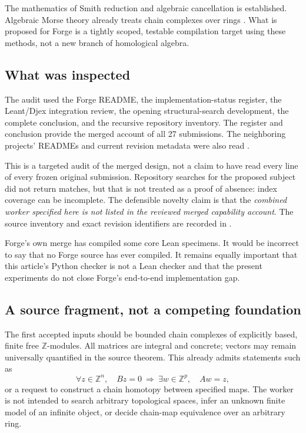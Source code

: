 \documentclass[11pt,letterpaper]{article}
\theoremstyle{definition}\newtheorem{definition}[theorem]{Definition}
\theoremstyle{remark}\newtheorem{remark}[theorem]{Remark}
\newcommand{\Z}{\mathbb Z}\newcommand{\Q}{\mathbb Q}
\newcommand{\code}[1]{\texttt{\detokenize{#1}}}
\begin{document}
The mathematics of Smith reduction and algebraic cancellation is established.
Algebraic Morse theory already treats chain complexes over rings
\cite{skoldberg}. What is proposed for Forge is a tightly scoped, testable
compilation target using these methods, not a new branch of homological algebra.

\subsection{What was inspected}
The audit used the Forge README, the implementation-status register, the
Leant/Djex integration review, the opening structural-search development,
the complete conclusion, and the recursive repository inventory. The register
and conclusion provide the merged account of all 27 submissions. The neighboring
projects' READMEs and current revision metadata were also read
\cite{forge-readme,forge-status,forge-neighbors,forge-structural,
forge-conclusion,leant,djex}.

This is a targeted audit of the merged design, not a claim to have read every
line of every frozen original submission. Repository searches for the proposed
subject did not return matches, but that is not treated as a proof of absence:
index coverage can be incomplete. The defensible novelty claim is that the
\emph{combined worker specified here is not listed in the reviewed merged
capability account}. The source inventory and exact revision identifiers are
recorded in \code{docs/AUDIT.md}.

Forge's own merge has compiled some core Lean specimens. It would be incorrect
to say that no Forge source has ever compiled. It remains equally important that
this article's Python checker is not a Lean checker and that the present
experiments do not close Forge's end-to-end implementation gap.

\subsection{A source fragment, not a competing foundation}
The first accepted inputs should be bounded chain complexes of explicitly
based, finite free $\Z$-modules. All matrices are integral and concrete; vectors
may remain universally quantified in the source theorem. This already admits
statements such as
\[
  \forall z\in\Z^n,\quad Bz=0\ \Longrightarrow\
  \exists w\in\Z^p,\quad Aw=z,
\]
or a request to construct a chain homotopy between specified maps.
The worker is not intended to search arbitrary topological spaces, infer an
unknown finite model of an infinite object, or decide chain-map equivalence over
an arbitrary ring.
\end{document}
